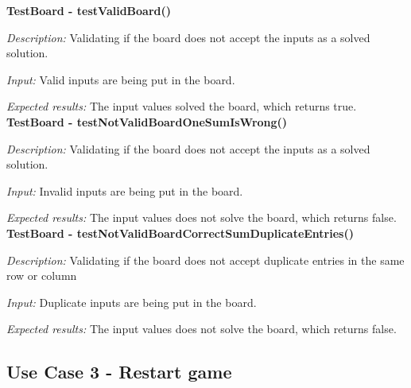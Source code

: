 \documentclass[12pt]{article}
\begin{document}
\textbf{TestBoard - testValidBoard()} 
    
\textit{Description:} \newline
Validating if the board does not accept the inputs as a solved solution.  \newline

\textit{Input:} \newline
Valid inputs are being put in the board. \newline 

\textit{Expected results:} \newline
The input values solved the board, which returns true. \newline
\\

\textbf{TestBoard - testNotValidBoardOneSumIsWrong()} 
    
\textit{Description:} \newline
Validating if the board does not accept the inputs as a solved solution.  \newline

\textit{Input:} \newline
Invalid inputs are being put in the board. \newline 

\textit{Expected results:} \newline
The input values does not solve the board, which returns false. \newline
\\

\textbf{TestBoard - testNotValidBoardCorrectSumDuplicateEntries()} 
    
\textit{Description:} \newline
Validating if the board does not accept duplicate entries in the same row or column  \newline

\textit{Input:} \newline
Duplicate inputs are being put in the board. \newline 

\textit{Expected results:} \newline
The input values does not solve the board, which returns false. \newline
\\

\newpage


\subsection{Use Case 3 - Restart game}
\end{document}
